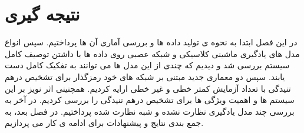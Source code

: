 \section{نتیجه گیری}

در این فصل ابتدا به نحوه ی تولید داده ها و بررسی آماری آن ها پرداختیم. سپس انواع مدل های یادگیری ماشینی کلاسیکی و شبکه عصبی روی داده ها با داشتن توصیف کامل سیستم بررسی شد و دیدیم که چندی از این مدل ها می توانند به تفکیک کامل دست یابند. سپس دو معماری جدید مبتنی بر شبکه های خود رمزگذار برای تشخیص درهم تنیدگی با تعداد آزمایش کمتر خطی و غیر خطی ارایه کردیم. همچنینی اثر نویز بر این سیستم ها و اهمیت ویژگی ها برای تشخیص درهم تنیدگی را بررسی کردیم. در آخر به بررسی چند مدل یادگیری نظارت نشده و شبه نظارت شده پرداختیم. در فصل بعد، به جمع بندی نتایج و پیشنهادات برای ادامه ی کار می پردازیم.
